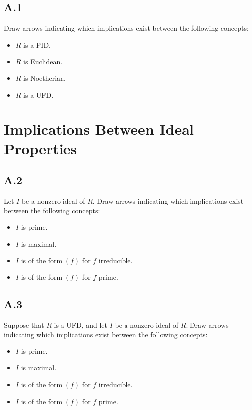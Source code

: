 \documentclass[lang=cn,11pt]{template}
\begin{document}
\subsection*{A.1} Draw arrows indicating which implications exist between the following concepts:
\begin{itemize}
    \item \( R \) is a PID.
    \item \( R \) is Euclidean.
    \item \( R \) is Noetherian.
    \item \( R \) is a UFD.
\end{itemize}

\section{Implications Between Ideal Properties}

\subsection*{A.2} Let \( I \) be a nonzero ideal of \( R \). Draw arrows indicating which implications exist between the following concepts:
\begin{itemize}
    \item \( I \) is prime.
    \item \( I \) is maximal.
    \item \( I \) is of the form \( (f) \) for \( f \) irreducible.
    \item \( I \) is of the form \( (f) \) for \( f \) prime.
\end{itemize}

\subsection*{A.3} Suppose that \( R \) is a UFD, and let \( I \) be a nonzero ideal of \( R \). Draw arrows indicating which implications exist between the following concepts:
\begin{itemize}
    \item \( I \) is prime.
    \item \( I \) is maximal.
    \item \( I \) is of the form \( (f) \) for \( f \) irreducible.
    \item \( I \) is of the form \( (f) \) for \( f \) prime.
\end{itemize}
\end{document}
